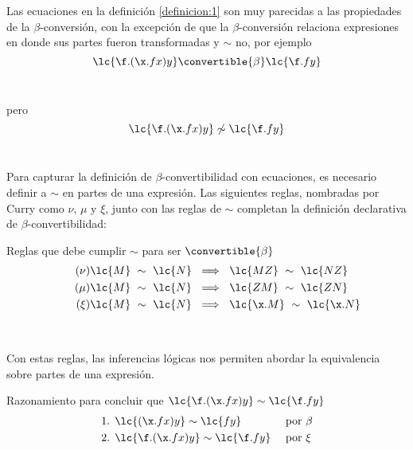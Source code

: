 Las ecuaciones en la definición \ref{definicion:1} son muy parecidas a las
propiedades de la \(\beta\)-conversión, con la excepción de que la
\(\beta\)-conversión relaciona expresiones en donde sus partes fueron
transformadas y \(\sim\) no, por ejemplo \\

\[\lc{\f.(\x.f x)y} \convertible{\beta} \lc{\f.f y}\] \

pero \\

\[\lc{\f.(\x.f x)y} \not\sim \lc{\f.f y}\] \

Para capturar la definición de \(\beta\)-convertibilidad con ecuaciones, es
necesario definir a \(\sim\) en partes de una expresión. Las siguientes reglas,
nombradas por Curry \cite[p.~59]{Curry:CombinatoryLogicI} como \(\nu\), \(\mu\) y
\(\xi\), junto con las reglas de \(\sim\) completan la definición declarativa de
\(\beta\)-convertibilidad: \\

\begin{defi} Reglas que debe cumplir \(\sim\) para ser \(\convertible{\beta}\)
  \label{definicion:2}
  \begin{subequations}
    \begin{align}
      \label{definicion:2:nu} \tag{\ensuremath{\nu}}
      \lc{M}\ \sim\ \lc{N}\ &\implies\ \lc{M Z}\ \sim\ \lc{N Z}
      \\
      \label{definicion:2:mu} \tag{\ensuremath{\mu}}
      \lc{M}\ \sim\ \lc{N}\ &\implies\ \lc{Z M}\ \sim\ \lc{Z N}
      \\
      \label{definicion:3:xi} \tag{\ensuremath{\xi}}
      \lc{M}\ \sim\ \lc{N}\ &\implies\ \lc{\x.M}\ \sim\ \lc{\x.N}
    \end{align}
  \end{subequations}
\end{defi} \

Con estas reglas, las inferencias lógicas nos permiten abordar la equivalencia
sobre partes de una expresión. \\

\begin{ejemplo} Razonamiento para concluir que \(\lc{\f.(\x.f x)y} \sim \lc{\f.f y}\)
  \begin{align*}
    \text{1. } &\lc{(\x.f x)y} \sim \lc{f y} & &\text{ por \(\beta\)} \\
    \text{2. } &\lc{\f.(\x.f x)y} \sim \lc{\f.f y} & &\text{ por \(\xi\)}
  \end{align*}
\end{ejemplo} \

